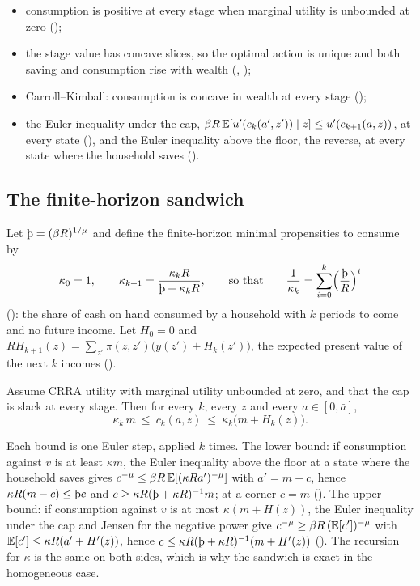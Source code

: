 \begin{itemize}[leftmargin=1.5em]
\item consumption is positive at every stage when marginal utility is unbounded at zero
  ();
\item the stage value has concave slices, so the optimal action is unique and both saving and
  consumption rise with wealth (, );
\item Carroll--Kimball: consumption is concave in wealth at every stage
  ();
\item the Euler inequality under the cap, $\beta R\,\mathbb{E}[u'(c_k(a',z'))\mid z]\le u'(c_{k+1}(a,z))$,
  at every state (), and the Euler inequality above the floor, the reverse,
  at every state where the household saves ().
\end{itemize}

\subsection{The finite-horizon sandwich}

Let $\Thorn=(\beta R)^{1/\mu}$ and define the finite-horizon minimal propensities to consume by
\[
  \kappa_0=1,\qquad \kappa_{k+1}=\frac{\kappa_kR}{\Thorn+\kappa_kR},\qquad\text{so that}\qquad
  \frac1{\kappa_k}=\sum_{i=0}^{k}\Bigl(\frac{\Thorn}{R}\Bigr)^{i}
\]
(): the share of cash on hand consumed by a household with $k$ periods to come and
no future income. Let $H_0=0$ and $RH_{k+1}(z)=\sum_{z'}\pi(z,z')\bigl(y(z')+H_k(z')\bigr)$, the
expected present value of the next $k$ incomes ().

\begin{theorem}\label{thm:sandwich}
Assume CRRA utility with marginal utility unbounded at zero, and that the cap is slack at every
stage. Then for every $k$, every $z$ and every $a\in[0,\bar a]$,
\[
  \kappa_k\,m\ \le\ c_k(a,z)\ \le\ \kappa_k\bigl(m+H_k(z)\bigr).
\]
\end{theorem}

Each bound is one Euler step, applied $k$ times. The lower bound: if consumption against $v$ is at
least $\kappa m$, the Euler inequality above the floor at a state where the household saves gives
$c^{-\mu}\le\beta R\,\mathbb{E}[(\kappa Ra')^{-\mu}]$ with $a'=m-c$, hence $\kappa R(m-c)\le\Thorn c$ and
$c\ge\kappa R(\Thorn+\kappa R)^{-1}m$; at a corner $c=m$ (). The upper
bound: if consumption against $v$ is at most $\kappa(m+H(z))$, the Euler inequality under the cap
and Jensen for the negative power give $c^{-\mu}\ge\beta R\,(\mathbb{E}[c'])^{-\mu}$ with
$\mathbb{E}[c']\le\kappa R(a'+H'(z))$, hence $c\le\kappa R(\Thorn+\kappa R)^{-1}(m+H'(z))$
(). The recursion for $\kappa$ is the same on both sides, which is
why the sandwich is exact in the homogeneous case.

